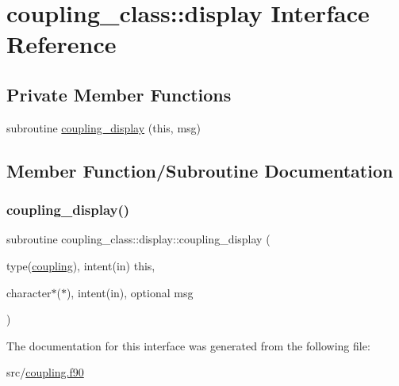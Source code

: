 \hypertarget{interfacecoupling__class_1_1display}{}\section{coupling\+\_\+class\+:\+:display Interface Reference}
\label{interfacecoupling__class_1_1display}
\subsection*{Private Member Functions}
\begin{DoxyCompactItemize}
\item 
subroutine \hyperlink{interfacecoupling__class_1_1display_a4b78570031cdb831119d6a140a1aa55b}{coupling\+\_\+display} (this, msg)
\end{DoxyCompactItemize}


\subsection{Member Function/\+Subroutine Documentation}
\mbox{\label{interfacecoupling__class_1_1display_a4b78570031cdb831119d6a140a1aa55b}} 
\subsubsection{\texorpdfstring{coupling\+\_\+display()}{coupling\_display()}}
{\footnotesize\ttfamily subroutine coupling\+\_\+class\+::display\+::coupling\+\_\+display (\begin{DoxyParamCaption}\item[{type(\hyperlink{structcoupling__class_1_1coupling}{coupling}), intent(in)}]{this,  }\item[{character$\ast$($\ast$), intent(in), optional}]{msg }\end{DoxyParamCaption})\hspace{0.3cm}{\ttfamily [private]}}



The documentation for this interface was generated from the following file\+:\begin{DoxyCompactItemize}
\item 
src/\hyperlink{coupling_8f90}{coupling.\+f90}\end{DoxyCompactItemize}
